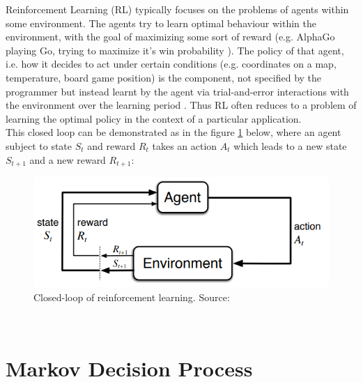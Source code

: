 Reinforcement Learning (RL) typically focuses on the problems of agents within some environment. The agents try to learn optimal behaviour within the environment, with the goal of maximizing some sort of reward (e.g. AlphaGo playing Go, trying to maximize it's win probability \cite{alpha_go_lee_sedol}). The policy of that agent, i.e. how it decides to act under certain conditions (e.g. coordinates on a map, temperature, board game position) is the component, not specified by the programmer but instead learnt by the agent via trial-and-error interactions with the environment over the learning period \cite{sutton_barto}. Thus RL often reduces to a problem of learning the optimal policy in the context of a particular application.\\

This closed loop can be demonstrated as in the figure \ref{fig:closed_loop} below, where an agent subject to state $S_{t}$
and reward $R_{t}$ takes an action $A_{t}$ which leads to a new
state $S_{t+1}$ and a new reward $R_{t+1}$:

\begin{figure}[h!]
  \centering
  \includegraphics[scale=0.7]{figures/closed_loop.PNG}
  \caption{Closed-loop of reinforcement learning. Source: \cite{sutton_barto}}
  \label{fig:closed_loop}
\end{figure}\\  


 
\section{Markov Decision Process}

